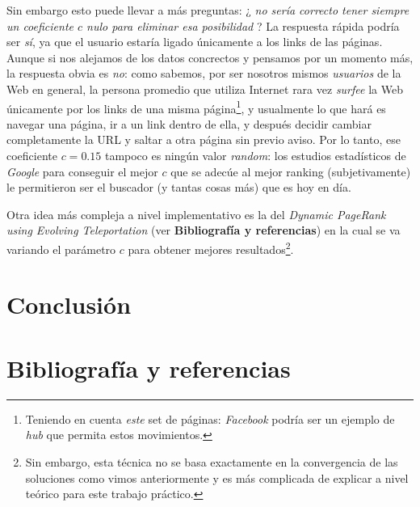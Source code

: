 \vspace{\baselineskip}
Sin embargo esto puede llevar a más preguntas: ¿ \textit{no sería correcto tener siempre un coeficiente $c$ nulo para eliminar esa posibilidad} ? La respuesta rápida podría ser \textit{sí}, ya que el usuario estaría ligado únicamente a los links de las páginas. Aunque si nos alejamos de los datos concrectos y pensamos por un momento más, la respuesta obvia es \textit{no}: como sabemos, por ser nosotros mismos \textit{usuarios} de la Web en general, la persona promedio que utiliza Internet rara vez \textit{surfee} la Web únicamente por los links de una misma página\footnote{Teniendo en cuenta \textit{este} set de páginas: \textit{Facebook} podría ser un ejemplo de \textit{hub} que permita estos movimientos.}, y usualmente lo que hará es navegar una página, ir a un link dentro de ella, y después decidir cambiar completamente la URL y saltar a otra página sin previo aviso. Por lo tanto, ese coeficiente $c = 0.15$ tampoco es ningún valor \textit{random}: los estudios estadísticos de \textit{Google} para conseguir el mejor $c$ que se adecúe al mejor ranking (subjetivamente) le permitieron ser el buscador (y tantas cosas más) que es hoy en día. 

Otra idea más compleja a nivel implementativo es la del \textit{Dynamic PageRank using Evolving Teleportation} (ver \textbf{Bibliografía y referencias}) en la cual se va variando el parámetro $c$ para obtener mejores resultados\footnote{Sin embargo, esta técnica no se basa exactamente en la convergencia de las soluciones como vimos anteriormente y es más complicada de explicar a nivel teórico para este trabajo práctico.}.

\section{Conclusión}


\section{Bibliografía y referencias} %

